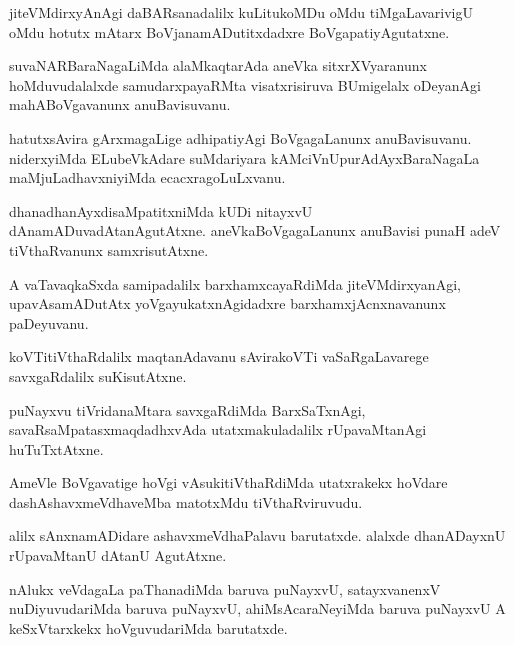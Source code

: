 \documentclass{article}
\begin{document}
\begin{mn}
jiteVMdirxyAnAgi daBARsanadalilx kuLitukoMDu oMdu tiMgaLavarivigU oMdu hotutx mAtarx 
BoVjanamADutitxdadxre BoVgapatiyAgutatxne.
\end{mn}

\begin{mn}
suvaNARBaraNagaLiMda alaMkaqtarAda aneVka sitxrXVyaranunx hoMduvudalalxde  samudarxpayaRMta 
visatxrisiruva BUmigelalx oDeyanAgi mahABoVgavanunx anuBavisuvanu.
\end{mn}

\begin{mn}
hatutxsAvira gArxmagaLige adhipatiyAgi BoVgagaLanunx anuBavisuvanu. niderxyiMda ELubeVkAdare 
suMdariyara kAMciVnUpurAdAyxBaraNagaLa maMjuLadhavxniyiMda ecacxragoLuLxvanu.
\end{mn}

\begin{mn}
dhanadhanAyxdisaMpatitxniMda kUDi nitayxvU dAnamADuvadAtanAgutAtxne. aneVkaBoVgagaLanunx anuBavisi 
punaH adeV tiVthaRvanunx samxrisutAtxne.
\end{mn}

\begin{mn}
A vaTavaqkaSxda samipadalilx barxhamxcayaRdiMda jiteVMdirxyanAgi, upavAsamADutAtx 
yoVgayukatxnAgidadxre barxhamxjAcnxnavanunx paDeyuvanu.
\end{mn}

\begin{mn}
koVTitiVthaRdalilx maqtanAdavanu sAvirakoVTi vaSaRgaLavarege savxgaRdalilx suKisutAtxne.
\end{mn}

\begin{mn}
puNayxvu tiVridanaMtara savxgaRdiMda BarxSaTxnAgi, savaRsaMpatasxmaqdadhxvAda utatxmakuladalilx 
rUpavaMtanAgi huTuTxtAtxne.
\end{mn}

\begin{mn}
AmeVle BoVgavatige hoVgi vAsukitiVthaRdiMda utatxrakekx hoVdare dashAshavxmeVdhaveMba matotxMdu 
tiVthaRviruvudu.
\end{mn}

\begin{mn}
alilx sAnxnamADidare ashavxmeVdhaPalavu barutatxde. alalxde dhanADayxnU rUpavaMtanU dAtanU 
AgutAtxne.
\end{mn}

\begin{mn}
nAlukx veVdagaLa paThanadiMda  baruva puNayxvU, satayxvanenxV nuDiyuvudariMda  baruva puNayxvU, 
ahiMsAcaraNeyiMda baruva puNayxvU A keSxVtarxkekx hoVguvudariMda barutatxde.
\end{mn}
\end{document}

